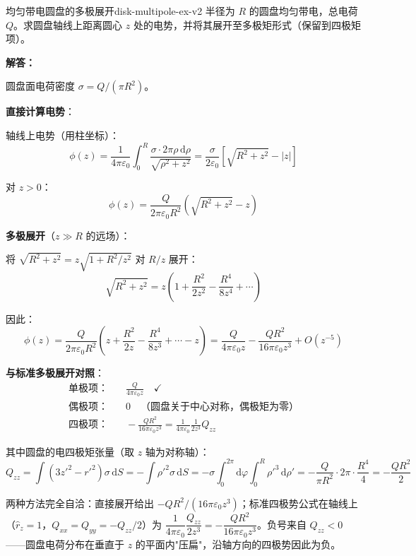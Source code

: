 \documentclass[11pt,a4paper,openany,oneside]{book}
\newcommand{\diff}{\mathrm{d}}
\newcommand{\eps}{\varepsilon}
\newcommand{\difficulty}[1]{\marginnote{\textcolor{red}{\textbf{[#1]}}}}
\begin{document}
\begin{example}{均匀带电圆盘的多极展开}{disk-multipole-ex-v2}
\difficulty{提高}
半径为 $R$ 的圆盘均匀带电，总电荷 $Q$。求圆盘轴线上距离圆心 $z$ 处的电势，并将其展开至多极矩形式（保留到四极矩项）。

\tcblower
\textbf{解答：}

圆盘面电荷密度 $\sigma = Q/(\pi R^2)$。

\textbf{直接计算电势}：

轴线上电势（用柱坐标）：
\[
\phi(z) = \frac{1}{4\pi\eps_0}\int_0^R \frac{\sigma \cdot 2\pi\rho\,\diff\rho}{\sqrt{\rho^2+z^2}}
= \frac{\sigma}{2\eps_0}\left[\sqrt{R^2+z^2} - |z|\right]
\]

对 $z > 0$：
\[
\phi(z) = \frac{Q}{2\pi\eps_0 R^2}\left(\sqrt{R^2+z^2} - z\right)
\]

\textbf{多极展开}（$z \gg R$ 的远场）：

将 $\sqrt{R^2+z^2} = z\sqrt{1+R^2/z^2}$ 对 $R/z$ 展开：
\[
\sqrt{R^2+z^2} = z\left(1 + \frac{R^2}{2z^2} - \frac{R^4}{8z^4} + \cdots\right)
\]

因此：
\[
\phi(z) = \frac{Q}{2\pi\eps_0 R^2}\left(z + \frac{R^2}{2z} - \frac{R^4}{8z^3} + \cdots - z\right)
= \frac{Q}{4\pi\eps_0 z} - \frac{Q R^2}{16\pi\eps_0 z^3} + O(z^{-5})
\]

\textbf{与标准多极展开对照}：
\begin{align*}
\text{单极项：} &\quad \frac{Q}{4\pi\eps_0 z} \quad\checkmark \\
\text{偶极项：} &\quad 0 \quad\text{（圆盘关于中心对称，偶极矩为零）} \\
\text{四极项：} &\quad -\frac{QR^2}{16\pi\eps_0 z^3} = \frac{1}{4\pi\eps_0}\frac{1}{2z^3}Q_{zz}
\end{align*}

其中圆盘的电四极矩张量（取 $z$ 轴为对称轴）：
\[
Q_{zz} = \int(3z'^2 - r'^2)\sigma\,\diff S = -\int\rho'^2\sigma\,\diff S
= -\sigma \int_0^{2\pi}\diff\varphi\int_0^R \rho'^3\,\diff\rho'
= -\frac{Q}{\pi R^2}\cdot 2\pi\cdot\frac{R^4}{4} = -\frac{QR^2}{2}
\]

两种方法完全自洽：直接展开给出 $-QR^2/(16\pi\eps_0 z^3)$；标准四极势公式在轴线上（$\hat{r}_z = 1$，$Q_{xx} = Q_{yy} = -Q_{zz}/2$）为 $\dfrac{1}{4\pi\eps_0}\dfrac{Q_{zz}}{2z^3} = -\dfrac{QR^2}{16\pi\eps_0 z^3}$。负号来自 $Q_{zz} < 0$——圆盘电荷分布在垂直于 $z$ 的平面内"压扁"，沿轴方向的四极势因此为负。
\end{example}
\end{document}
